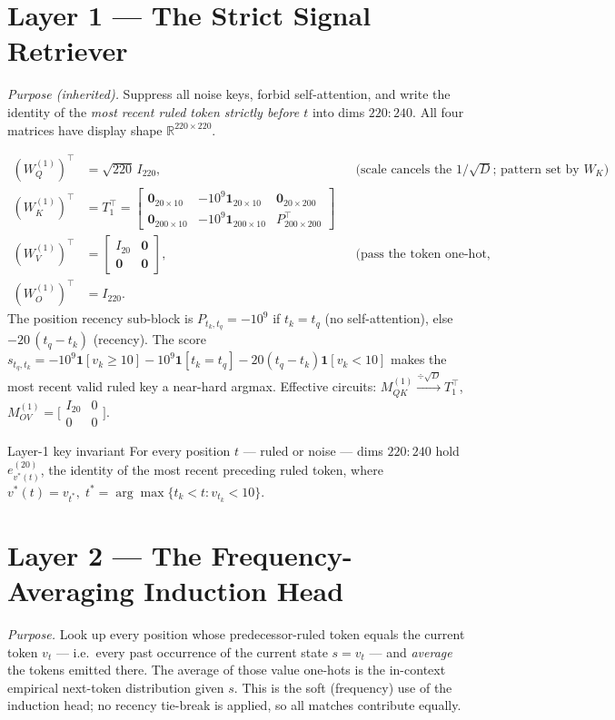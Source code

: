 \documentclass[11pt]{article}
\newcommand{\ev}[2]{e^{(#1)}_{#2}}        %
\newcommand{\R}{\mathbb{R}}
\newcommand{\T}{^{\!\top}}
\newcommand{\vstar}{v^{*}}
\newcommand{\one}{\mathbf{1}}
\newcommand{\zeros}{\mathbf{0}}
\begin{document}
\section{Layer 1 --- The Strict Signal Retriever}
\emph{Purpose (inherited).} Suppress all noise keys, forbid self-attention, and write the
identity of the \emph{most recent ruled token strictly before $t$} into dims $220{:}240$.
All four matrices have display shape $\R^{220\times220}$.

\begin{align}
(W^{(1)}_Q)\T &= \sqrt{220}\,I_{220}, &&\text{(scale cancels the }1/\!\sqrt{D}\text{; pattern set by }W_K)\\
(W^{(1)}_K)\T &= T_1\T =
\begin{bmatrix} \zeros_{20\times10} & -10^{9}\one_{20\times10} & \zeros_{20\times200}\\[1pt]
\zeros_{200\times10} & -10^{9}\one_{200\times10} & P\T_{200\times200}\end{bmatrix}\\
(W^{(1)}_V)\T &= \begin{bmatrix} I_{20}&\zeros\\ \zeros&\zeros\end{bmatrix},
&&\text{(pass the token one-hot, drop position)}\\
(W^{(1)}_O)\T &= I_{220}.
\end{align}
The position recency sub-block is $P_{t_k,t_q}=-10^{9}$ if $t_k=t_q$ (no self-attention),
else $-20\,(t_q-t_k)$ (recency).
The score $s_{t_q,t_k}=-10^9\one[v_k\!\ge\!10]-10^9\one[t_k\!=\!t_q]-20(t_q-t_k)\one[v_k\!<\!10]$ makes
the most recent valid ruled key a near-hard argmax. Effective circuits:
$M^{(1)}_{QK}\!\xrightarrow{\div\sqrt{D}}\!T_1\T$, \;
$M^{(1)}_{OV}=\big[\begin{smallmatrix}I_{20}&0\\0&0\end{smallmatrix}\big]$.

\begin{invbox}{Layer-1 key invariant}
For every position $t$ --- ruled or noise --- dims $220{:}240$ hold $\ev{20}{\vstar(t)}$, the
identity of the most recent preceding ruled token, where
$\vstar(t)=v_{t^*},\;t^*=\arg\max\{t_k<t:v_{t_k}<10\}$.
\end{invbox}

\section{Layer 2 --- The Frequency-Averaging Induction Head}
\label{sec:l2}
\emph{Purpose.} Look up every position whose predecessor-ruled token equals the current token
$v_t$ --- i.e.\ every past occurrence of the current state $s=v_t$ --- and \emph{average} the
tokens emitted there. The average of those value one-hots is the in-context empirical next-token
distribution given $s$. This is the soft (frequency) use of the induction head; no recency tie-break
is applied, so all matches contribute equally.
\end{document}
